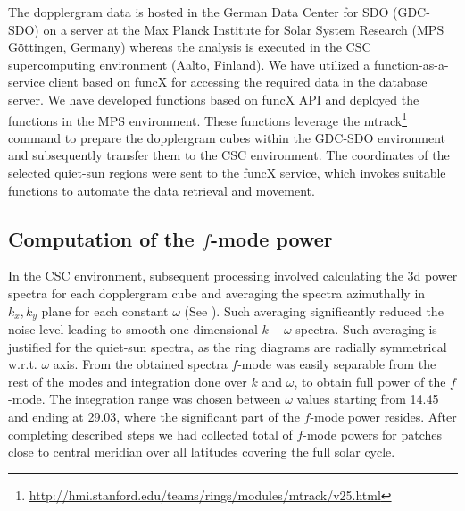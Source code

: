 \documentclass{aa}
\begin{document}
The dopplergram data is hosted in the German Data Center for SDO (GDC-SDO) on a server at the Max Planck Institute for Solar System Research (MPS Göttingen, Germany) whereas the analysis is executed in the CSC supercomputing environment (Aalto, Finland). We have utilized  a function-as-a-service client based on funcX \cite[]{chard20funcx} for accessing the required data in the database server. We have developed functions based on funcX API and deployed the functions in the MPS environment. These functions leverage the mtrack\footnote{\url{http://hmi.stanford.edu/teams/rings/modules/mtrack/v25.html}} command to prepare the dopplergram cubes within the GDC-SDO environment and subsequently transfer them to the CSC environment. The coordinates of the selected quiet-sun regions were sent to the funcX service, which invokes suitable functions to automate the data retrieval and movement.


\subsection{Computation of the $f$-mode power}

In the CSC environment, subsequent processing involved calculating the 3d power spectra for each dopplergram cube and averaging the spectra azimuthally in $k_x, k_y$ plane for each constant $\omega$ (See ). Such averaging significantly reduced the noise level leading to smooth one dimensional $k-\omega$ spectra. Such averaging is justified for the quiet-sun spectra, as the ring diagrams are radially symmetrical w.r.t. $\omega$ axis. From the obtained spectra $f$-mode was easily separable from the rest of the modes and integration done over $k$ and $\omega$, to obtain full power of the $f$-mode. The integration range was chosen between $\omega$ values starting from 14.45 and ending at 29.03, where the significant part of the $f$-mode power resides. After completing described steps we had collected total of  $f$-mode powers for patches close to central meridian over all latitudes covering the full solar cycle.
\end{document}
